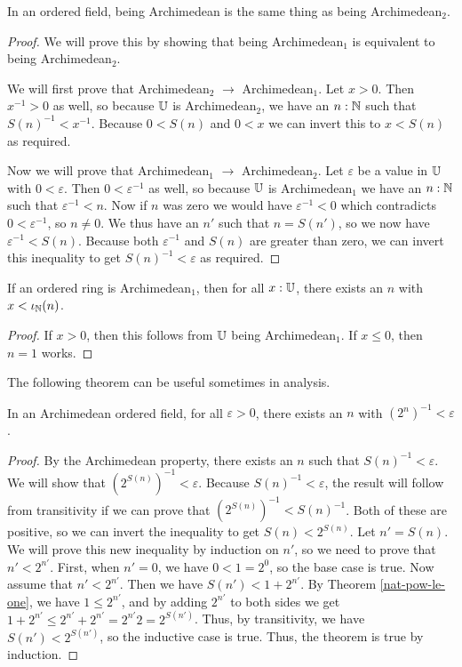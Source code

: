 \documentclass[../math.tex]{subfiles}
\begin{document}
\begin{theorem}
    In an ordered field, being Archimedean is the same thing as being
    Archimedean$_2$.
\end{theorem}
\begin{proof}
    We will prove this by showing that being Archimedean$_1$ is equivalent to
    being \linebreak Archimedean$_2$.

    We will first prove that Archimedean$_2$ $\rightarrow$ Archimedean$_1$.  Let
    $x > 0$.  Then $x^{-1} > 0$ as well, so because $\mathbb{U}$ is Archimedean$_2$, we
    have an $n : \mathbb{N}$ such that $S(n)^{-1} < x^{-1}$.  Because $0 < S(n)$ and $0
    < x$ we can invert this to $x < S(n)$ as required.

    Now we will prove that Archimedean$_1$ $\rightarrow$ Archimedean$_2$.  Let
    $\varepsilon$ be a value in $\mathbb{U}$ with $0 < \varepsilon$.  Then
    $0 < \varepsilon^{-1}$ as well, so because $\mathbb{U}$ is Archimedean$_1$ we have
    an $n : \mathbb{N}$ such that $\varepsilon^{-1} < n$.  Now if $n$ was zero we would
    have $\varepsilon^{-1} < 0$ which contradicts $0 < \varepsilon^{-1}$, so $n
    \neq 0$.  We thus have an $n'$ such that $n = S(n')$, so we now have
    $\varepsilon^{-1} < S(n)$.  Because both $\varepsilon^{-1}$ and $S(n)$ are
    greater than zero, we can invert this inequality to get $S(n)^{-1} <
    \varepsilon$ as required.
\end{proof}

\begin{theorem}
    If an ordered ring is Archimedean$_1$, then for all $x : \mathbb{U}$, there exists
    an $n$ with $x < \iota_{\mathbb{N}}(n)$.
\end{theorem}
\begin{proof}
    If $x > 0$, then this follows from $\mathbb{U}$ being Archimedean$_1$.  If $x \leq
    0$, then $n = 1$ works.
\end{proof}

The following theorem can be useful sometimes in analysis.

\begin{theorem}
    In an Archimedean ordered field, for all $\varepsilon > 0$, there exists an
    $n$ with $(2^n)^{-1} < \varepsilon$.
\end{theorem}
\begin{proof}
    By the Archimedean property, there exists an $n$ such that $S(n)^{-1} <
    \varepsilon$.  We will show that $(2^{S(n)})^{-1} < \varepsilon$.  Because
    $S(n)^{-1} < \varepsilon$, the result will follow from transitivity if we
    can prove that $(2^{S(n)})^{-1} < S(n)^{-1}$.  Both of these are positive,
    so we can invert the inequality to get $S(n) < 2^{S(n)}$.  Let $n' = S(n)$.
    We will prove this new inequality by induction on $n'$, so we need to prove
    that $n' < 2^{n'}$.  First, when $n' = 0$, we have $0 < 1 = 2^0$, so the
    base case is true.  Now assume that $n' < 2^{n'}$.  Then we have $S(n') < 1
    + 2^{n'}$.  By Theorem \ref{nat-pow-le-one}, we have $1 \leq 2^{n'}$, and by
    adding $2^{n'}$ to both sides we get $1 + 2^{n'} \leq 2^{n'} + 2^{n'} =
    2^{n'}2 = 2^{S(n')}$.  Thus, by transitivity, we have $S(n') < 2^{S(n')}$,
    so the inductive case is true.  Thus, the theorem is true by induction.
\end{proof}
\end{document}
